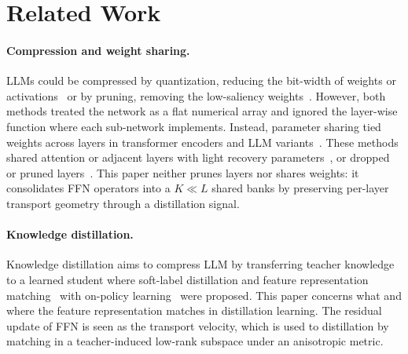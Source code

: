 \documentclass[letterpaper]{article} %
\theoremstyle{plain}
\theoremstyle{definition}
\begin{document}
\section{Related Work}
\label{sec:related}
\paragraph{Compression and weight sharing.}
LLMs could be compressed by quantization, reducing the bit-width of weights or activations~\citep{jacob2018quantization,frantar2023gptq,lin2023awq} or by pruning, removing the low-saliency weights~\citep{han2015deepcompression,frantar2023sparsegpt,sun2024wanda,ma2023llmpruner}. However, both methods treated the network as a flat numerical array and ignored the layer-wise {function} where each sub-network implements. Instead, parameter sharing tied weights across layers in transformer encoders and LLM variants~\citep{lan2020albert, dehghani2019universal}. These methods shared attention or adjacent layers with light recovery parameters~\citep{shareyourattention, flexigpt}, or dropped or pruned layers~\citep{men2024shortgpt, chen2025streamlining, flatllm, flap}. This paper neither prunes layers nor shares weights: it consolidates {FFN} operators into a $K\ll L$ shared banks by preserving per-layer transport geometry through a distillation signal.

\paragraph{Knowledge distillation.}
Knowledge distillation aims to compress LLM by transferring teacher knowledge to a learned student where soft-label distillation and feature representation matching~\citep{romero2015fitnets, jiao2020tinybert, wang2020minilm, sanh2019distilbert} with on-policy learning~\citep{gu2024minillm, agarwal2024gkd} were proposed. This paper concerns what and where the feature representation matches in distillation learning. The residual update of FFN is seen as the transport velocity, which is used to distillation by matching in a teacher-induced low-rank subspace under an anisotropic metric. 
\end{document}
